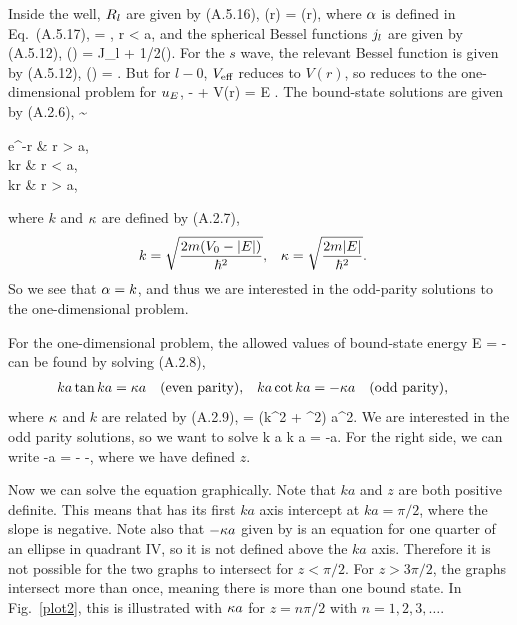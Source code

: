 \begin{solution}
	Inside the well, $R_l$ are given by (A.5.16),
	\beq
		\Rl(r) = \constant \jl(\alp r),
	\eeq
	where $\alpha$ is defined in Eq.~(A.5.17),
	\beq
		\alp = , \quad r < a,
	\eeq
	\clearpage
	and the spherical Bessel functions $j_l$ are given by (A.5.12),
	\beq
		\jl(\rho) = \sqrt{\frac{\pi}{2\rho}} J_{l + 1/2}(\rho).
	\eeq
	For the $s$ wave, the relevant Bessel function is given by (A.5.12),
	\beqn \label{jo}
		\jo(\rho) = \frac{\sin\rho}{\rho}.
	\eeqn
	But for $l - 0$, $V_{\text{eff}}$ reduces to $V(r)$, so  reduces to the one-dimensional problem for $u_E$,
	\beq
		-  + V(r) \uE = E \uE.
	\eeq
	The bound-state solutions are given by (A.2.6),
	\beq
		\uE \sim \begin{cases}
			e^{-\kap r} &  r > a, \\
			\cos kr \quad {} &  r < a, \\
			\sin kr \quad {} & \text{for } r > a,
		\end{cases}
	\eeq
	where $k$ and $\kappa$ are defined by (A.2.7),
	\begin{align*}
		k &= \sqrt{\frac{2m (V_0 - \abs{E})}{\hbar^2}}, &
		\kappa &= \sqrt{\frac{2m \abs{E}}{\hbar^2}}.
	\end{align*}
	So we see that $\alpha = k$, and thus we are interested in the odd-parity solutions to the one-dimensional problem.
	
	For the one-dimensional problem, the allowed values of bound-state energy
	\beq
		E = -\frac{\hbar^2 \kap^2}{2m}
	\eeq
	can be found by solving (A.2.8),
	\begin{align*}
		k a \tan k a &= \kappa a \quad\text{(even parity)}, &
		k a \cot k a &= -\kappa a \quad\text{(odd parity)},
	\end{align*}
	where $\kappa$ and $k$ are related by (A.2.9),
	\beq
		 = (k^2 + \kap^2) a^2.
	\eeq
	We are interested in the odd parity solutions, so we want to solve
	\beqn \label{ka}
		k a \cot k a = -\kap a.
	\eeqn
	For the right side, we can write
	\beqn \label{kapa}
		-\kap a = - \equiv -\sqrt{z^2 - (ka)^2},
	\eeqn
	where we have defined $z$.
	
	Now we can solve the equation graphically.  Note that $ka$ and $z$ are both positive definite. This means that  has its first $ka$ axis intercept at $ka = \pi/2$, where the slope is negative.  Note also that $-\kappa a$ given by  is an equation for one quarter of an ellipse in quadrant IV, so it is not defined above the $ka$ axis.  Therefore it is not possible for the two graphs to intersect for $z < \pi / 2$.  For $z > 3\pi / 2$, the graphs intersect more than once, meaning there is more than one bound state.  In Fig.~\ref{plot2}, this is illustrated with $\kappa a$ for $z = n \pi / 2$ with $n = 1, 2, 3, \ldots$.
	

\end{solution}

